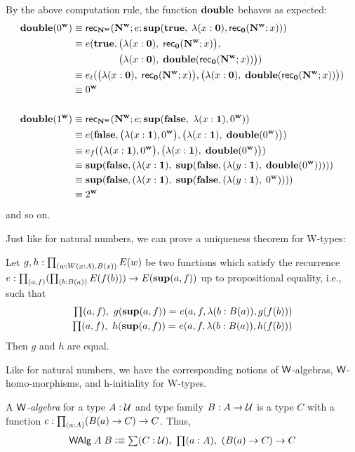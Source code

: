 By the above computation rule, the function $\mathbf{double}$ behaves as expected:
\begin{align*}
\mathbf{double}(0^\mathbf{w}) & \equiv \mathsf{rec}_{\mathbf{N^w}}(\mathbf{N^w}; e; \mathbf{sup}(\mathbf{true}, \; \lambda(x : \mathbf{0}), \mathsf{rec}_{\mathbf{0}}(\mathbf{N^w};x))) \\
& \equiv e(\mathbf{true}, \big(\lambda(x : \mathbf{0}), \; \mathsf{rec}_{\mathbf{0}}(\mathbf{N^w};x)\big), \\
 & \;\;\;\;\;\;\;\;\;\;\;\;\;\;\;\;\; \big(\lambda(x : \mathbf{0}), \; \mathbf{double}(\mathsf{rec}_{\mathbf{0}}(\mathbf{N^w};x))\big)) \\
 & \equiv e_t(\big(\lambda(x : \mathbf{0}), \; \mathsf{rec}_{\mathbf{0}}(\mathbf{N^w};x)\big), \big(\lambda(x : \mathbf{0}), \; \mathbf{double}(\mathsf{rec}_{\mathbf{0}}(\mathbf{N^w};x))\big)) \\
 & \equiv 0^\mathbf{w} \\
 \\
\mathbf{double}(1^\mathbf{w}) & \equiv \mathsf{rec}_{\mathbf{N^w}}(\mathbf{N^w}; e; \mathbf{sup}(\mathbf{false}, \; \lambda(x : \mathbf{1}), 0^\mathbf{w})) \\
& \equiv e(\mathbf{false}, \big(\lambda(x : \mathbf{1}), 0^\mathbf{w}\big), \big(\lambda(x : \mathbf{1}), \; \mathbf{double}(0^\mathbf{w})\big)) \\
 & \equiv e_f(\big(\lambda(x : \mathbf{1}), 0^\mathbf{w}\big), \big(\lambda(x : \mathbf{1}), \; \mathbf{double}(0^\mathbf{w})\big)) \\
 & \equiv \mathbf{sup}(\mathbf{false}, (\lambda (x:\mathbf{1}), \; \mathbf{sup}(\mathbf{false},(\lambda (y : \mathbf{1}), \; \mathbf{double}(0^\mathbf{w}))))) \\
 & \equiv \mathbf{sup}(\mathbf{false}, (\lambda (x:\mathbf{1}), \; \mathbf{sup}(\mathbf{false},(\lambda (y : \mathbf{1}), \; 0^\mathbf{w})))) \\
 & \equiv 2^\mathbf{w}
\end{align*}
and so on.

\medskip

Just like for natural numbers, we can prove a uniqueness theorem for 
W-types:
\begin{thm}\label{thm:w-uniq}
Let $g,h : \prd{w:\wtype{x:A}B(x)} E(w)$ be two functions which satisfy the recurrence $e : \prd{a,f} (\prd{b : B(a)} E(f(b))) \to E(\supp(a,f))$ up to propositional equality, i.e., such that
\begin{align*}
\prd{a,f} \id{g(\supp(a,f))}{e(a,f,\lambda (b: B(a)), g(f(b)))} \\
\prd{a,f} \id{h(\supp(a,f))}{e(a,f,\lambda (b: B(a)), h(f(b)))}
\end{align*}
Then $g$ and $h$ are equal. 
\end{thm}

Like for natural numbers, we have the corresponding notions of $\mathsf{W}$-algebras, $\mathsf{W}$-homo-morphisms, and h-initiality for W-types.
\begin{defn}
A \emph{$\mathsf{W}$-algebra} for a type $A : \mathcal{U}$ and type family $B : A \to \mathcal{U}$ is a type $C$ with a function $c : \prd{a:A} (B(a) \to C) \to C$. Thus,
\begin{align*}
\walg \; A \; B \defeq \sm {C : \type} \prd{a:A} (B(a) \to C) \to C
\end{align*}
\end{defn}

